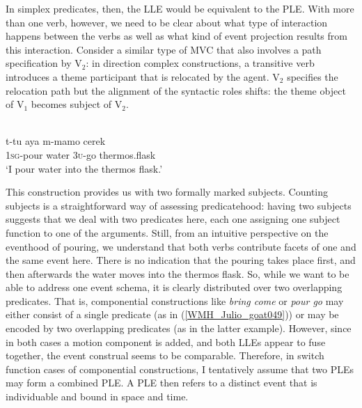 In simplex predicates, then, the LLE would be equivalent to the PLE. With more than one verb, however, we need to be clear about what type of interaction happens between the verbs as well as what kind of event projection results from this interaction. Consider a similar type of MVC that also involves a path specification by V$_2$: in direction complex constructions, a transitive verb introduces a theme participant that is relocated by the agent. V$_2$ specifies the relocation path but the alignment of the syntactic roles shifts: the theme object of V$_1$ becomes subject of V$_2$.

\ea 
{}\\
\gll t-tu aya m-mamo cerek \\
1\textsc{sg}-pour water 3\textsc{u}-go thermos.flask \\
\glft `I pour water into the thermos flask.'\\
\z

This construction provides us with two formally marked subjects. Counting subjects is a straightforward way of assessing predicatehood: having two subjects suggests that we deal with two predicates here, each one assigning one subject function to one of the arguments. Still, from an intuitive perspective on the eventhood of pouring, we understand that both verbs contribute facets of one and the same event here. There is no indication that the pouring takes place first, and then afterwards the water moves into the thermos flask. So, while we want to be able to address one event schema, it is clearly distributed over two overlapping predicates. That is, componential constructions like \textit{bring come} or \textit{pour go} may either consist of a single predicate (as in (\ref{WMH_Julio_goat049})) or may be encoded by two overlapping predicates (as in the latter example). However, since in both cases a motion component is added, and both LLEs appear to fuse together, the event construal seems to be comparable. Therefore, in switch function cases of componential constructions, I tentatively assume that two PLEs may form a combined PLE. A PLE then refers to a distinct event that is individuable and bound in space and time.

